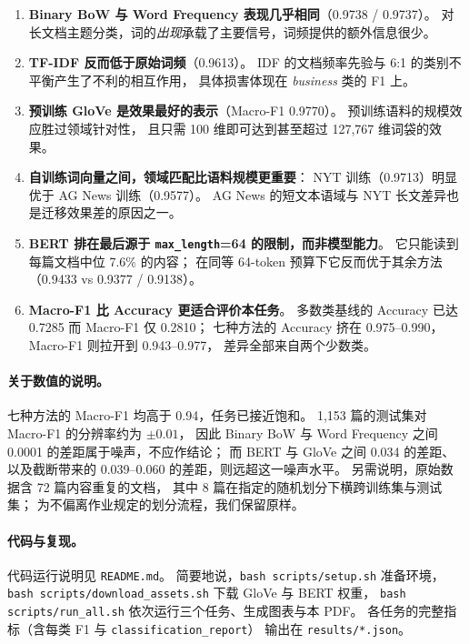 \documentclass[10pt,twocolumn,letterpaper]{article}
\begin{document}
\begin{enumerate}\itemsep3pt
\item \textbf{Binary BoW 与 Word Frequency 表现几乎相同}（0.9738 / 0.9737）。
对长文档主题分类，词的\emph{出现}承载了主要信号，词频提供的额外信息很少。

\item \textbf{TF-IDF 反而低于原始词频}（0.9613）。
IDF 的文档频率先验与 6:1 的类别不平衡产生了不利的相互作用，
具体损害体现在 \emph{business} 类的 F1 上。

\item \textbf{预训练 GloVe 是效果最好的表示}（Macro-F1 0.9770）。
预训练语料的规模效应胜过领域针对性，
且只需 100 维即可达到甚至超过 127{,}767 维词袋的效果。

\item \textbf{自训练词向量之间，领域匹配比语料规模更重要}：
NYT 训练（0.9713）明显优于 AG News 训练（0.9577）。
AG News 的短文本语域与 NYT 长文差异也是迁移效果差的原因之一。

\item \textbf{BERT 排在最后源于 \texttt{max\_length}=64 的限制，而非模型能力}。
它只能读到每篇文档中位 7.6\% 的内容；
在同等 64-token 预算下它反而优于其余方法（0.9433 vs 0.9377 / 0.9138）。

\item \textbf{Macro-F1 比 Accuracy 更适合评价本任务}。
多数类基线的 Accuracy 已达 0.7285 而 Macro-F1 仅 0.2810；
七种方法的 Accuracy 挤在 0.975--0.990，Macro-F1 则拉开到 0.943--0.977，
差异全部来自两个少数类。
\end{enumerate}

\paragraph{关于数值的说明。}
七种方法的 Macro-F1 均高于 0.94，任务已接近饱和。
1{,}153 篇的测试集对 Macro-F1 的分辨率约为 $\pm 0.01$，
因此 Binary BoW 与 Word Frequency 之间 0.0001 的差距属于噪声，不应作结论；
而 BERT 与 GloVe 之间 0.034 的差距、
以及截断带来的 0.039--0.060 的差距，则远超这一噪声水平。
另需说明，原始数据含 72 篇内容重复的文档，
其中 8 篇在指定的随机划分下横跨训练集与测试集；
为不偏离作业规定的划分流程，我们保留原样。

\paragraph{代码与复现。}
代码运行说明见 \texttt{README.md}。
简要地说，\texttt{bash scripts/setup.sh} 准备环境，
\texttt{bash scripts/download\_assets.sh} 下载 GloVe 与 BERT 权重，
\texttt{bash scripts/run\_all.sh} 依次运行三个任务、生成图表与本 PDF。
各任务的完整指标（含每类 F1 与 \texttt{classification\_report}）
输出在 \texttt{results/*.json}。

{\small


}
\end{document}
